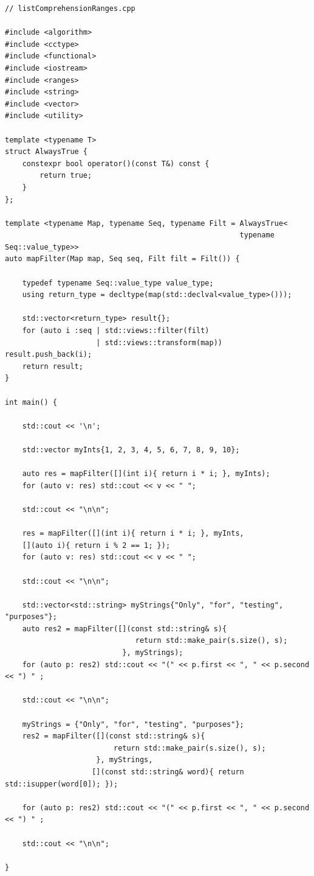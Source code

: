 \begin{lstlisting}[style=styleCXX]
// listComprehensionRanges.cpp

#include <algorithm>
#include <cctype>
#include <functional>
#include <iostream>
#include <ranges>
#include <string>
#include <vector>
#include <utility>

template <typename T>
struct AlwaysTrue {
	constexpr bool operator()(const T&) const {
		return true;
	}
};

template <typename Map, typename Seq, typename Filt = AlwaysTrue<
                                                      typename Seq::value_type>>
auto mapFilter(Map map, Seq seq, Filt filt = Filt()) {

	typedef typename Seq::value_type value_type;
	using return_type = decltype(map(std::declval<value_type>()));
	
	std::vector<return_type> result{};
	for (auto i :seq | std::views::filter(filt)
	                 | std::views::transform(map)) result.push_back(i);
	return result;
}

int main() {

	std::cout << '\n';
	
	std::vector myInts{1, 2, 3, 4, 5, 6, 7, 8, 9, 10};
	
	auto res = mapFilter([](int i){ return i * i; }, myInts);
	for (auto v: res) std::cout << v << " ";
	
	std::cout << "\n\n";
	
	res = mapFilter([](int i){ return i * i; }, myInts,
	[](auto i){ return i % 2 == 1; });
	for (auto v: res) std::cout << v << " ";
	
	std::cout << "\n\n";
	
	std::vector<std::string> myStrings{"Only", "for", "testing", "purposes"};
	auto res2 = mapFilter([](const std::string& s){
	                          return std::make_pair(s.size(), s);
	                       }, myStrings);
	for (auto p: res2) std::cout << "(" << p.first << ", " << p.second << ") " ;
	
	std::cout << "\n\n";
	
	myStrings = {"Only", "for", "testing", "purposes"};
	res2 = mapFilter([](const std::string& s){
	                     return std::make_pair(s.size(), s);
	                 }, myStrings,
	                [](const std::string& word){ return std::isupper(word[0]); });
	
	for (auto p: res2) std::cout << "(" << p.first << ", " << p.second << ") " ;
	
	std::cout << "\n\n";

}
\end{lstlisting}

